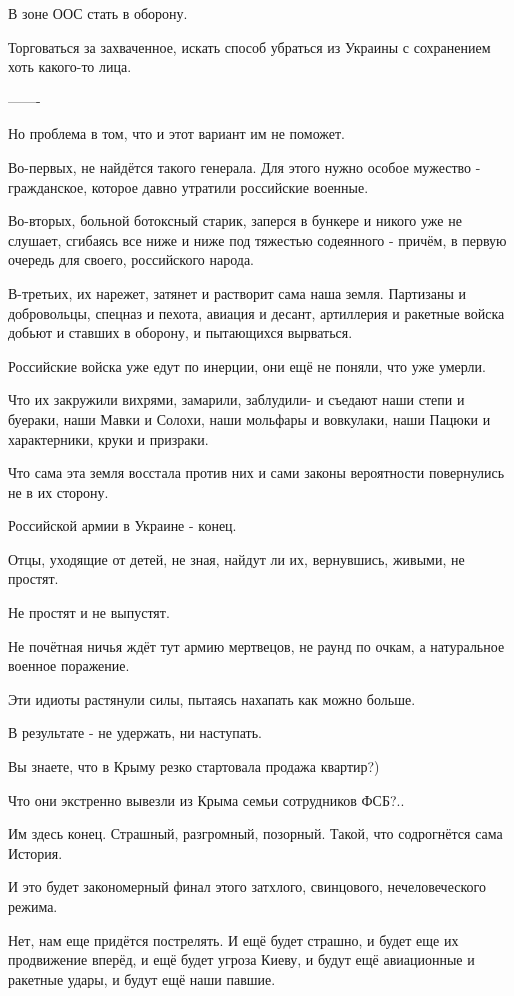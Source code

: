 В зоне ООС стать в оборону. 

Торговаться за захваченное, искать способ убраться из Украины с сохранением
хоть какого-то лица.

——-

Но проблема в том, что и этот вариант им не поможет.

Во-первых, не найдётся такого генерала. Для этого нужно особое мужество -
гражданское, которое давно утратили российские военные. 

Во-вторых, больной ботоксный старик, заперся в бункере и никого уже не слушает,
сгибаясь все ниже и ниже под тяжестью содеянного - причём, в первую очередь для
своего, российского народа. 

В-третьих, их нарежет, затянет и растворит сама наша земля. Партизаны и
добровольцы, спецназ и пехота, авиация и десант, артиллерия и ракетные войска
добьют и ставших в оборону, и пытающихся вырваться. 

Российские войска уже едут по инерции, они ещё не поняли, что уже умерли.

Что их закружили вихрями, замарили, заблудили-  и съедают наши степи и буераки,
наши Мавки и Солохи, наши мольфары и вовкулаки, наши Пацюки и характерники,
круки и призраки. 

Что сама эта земля восстала против них и сами законы вероятности повернулись не
в их сторону.

Российской армии в Украине - конец. 

Отцы, уходящие от детей, не зная, найдут ли их, вернувшись, живыми, не простят.

Не простят и не выпустят. 

Не почётная ничья ждёт тут армию мертвецов, не раунд по очкам, а натуральное
военное поражение.

Эти идиоты растянули силы, пытаясь нахапать как можно больше.

В результате - не удержать, ни наступать.

Вы знаете, что в Крыму резко стартовала продажа квартир?)

Что они экстренно вывезли из Крыма семьи сотрудников ФСБ?..

Им здесь конец. Страшный, разгромный, позорный. Такой, что содрогнётся сама
История.

И это будет закономерный финал этого затхлого, свинцового, нечеловеческого
режима.

Нет, нам еще придётся пострелять. И ещё  будет страшно, и будет еще их
продвижение вперёд, и ещё будет угроза Киеву, и будут ещё авиационные и
ракетные удары, и будут  ещё наши павшие.

